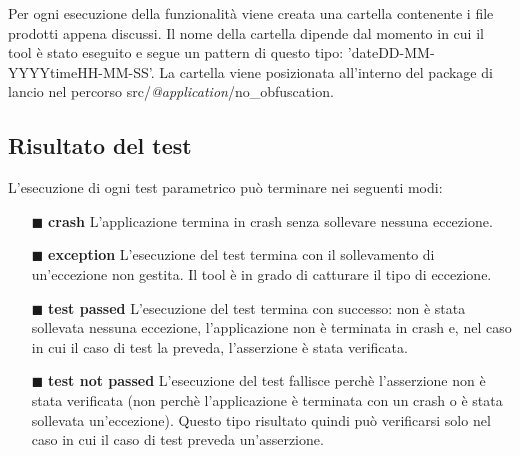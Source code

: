 \noindent Per ogni esecuzione della funzionalità viene creata una cartella contenente i file prodotti appena discussi. Il nome della cartella dipende dal momento in cui il tool è stato eseguito e segue un pattern di questo tipo: 'dateDD-MM-YYYYtimeHH-MM-SS'. La cartella viene posizionata all'interno del package di lancio nel percorso  src/\emph{@application}/no\_obfuscation.   
\newpage

\subsection*{Risultato del test}
L'esecuzione di ogni test parametrico può terminare nei seguenti modi:
\begin{itemize}[nosep]
\item [$\blacksquare$] \textbf{crash} \newline
L'applicazione termina in crash senza sollevare nessuna eccezione. 
\item [$\blacksquare$] \textbf{exception} \newline
L'esecuzione del test termina con il sollevamento di un'eccezione non gestita. Il tool è in grado di catturare il tipo di eccezione.
\item [$\blacksquare$] \textbf{test passed} \newline
L'esecuzione del test termina con successo: non è stata sollevata nessuna eccezione, l'applicazione non è terminata in crash e, nel caso in cui il caso di test la preveda, l'asserzione è stata verificata.
\item [$\blacksquare$] \textbf{test not passed} \newline
L'esecuzione del test fallisce perchè l'asserzione non è stata verificata (non perchè l'applicazione è terminata con un crash o è stata sollevata un'eccezione). Questo tipo risultato quindi può verificarsi solo nel caso in cui il caso di test preveda un'asserzione.
\end{itemize}


